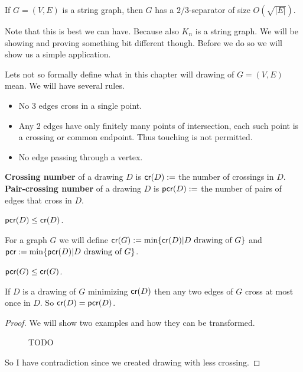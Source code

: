 \begin{thm}[Lee, 2017]
	If $G = (V,E)$ is a string graph, then $G$ has a $2/3$-separator of size $O(\sqrt{|E|})$.
	\label{lee}
\end{thm}

\noindent Note that this is best we can have. Because also $K_n$ is a string graph. We will be showing and proving something bit different though. Before we do so we will show us a simple application.

Lets not so formally define what in this chapter will drawing of $G = (V,E)$ mean. We will have several rules.

\begin{itemize}
	\item No 3 edges cross in a single point.
	\item Any 2 edges have only finitely many points of intersection, each such point is a crossing or common endpoint. Thus touching is not permitted.
	\item No edge passing through a vertex.
\end{itemize}



\begin{defn}
	\textbf{Crossing number} of a drawing $D$ is $\textsf{cr}(D) :=$ the number of crossings in $D$. \textbf{Pair-crossing number} of a drawing $D$ is $\textsf{pcr}(D) :=$ the number of pairs of edges that cross in $D$.
\end{defn}

\begin{observ}
	$\textsf{pcr}(D) \leq \textsf{cr}(D)$.
\end{observ}

For a graph $G$ we will define $\textsf{cr}(G) := \min \{\textsf{cr}(D) | D \text{ drawing of } G\}$ and $\textsf{pcr} := \min \{\textsf{pcr}(D) | D \text{ drawing of } G\}$.

\begin{observ}
	$\textsf{pcr}(G) \leq \textsf{cr}(G)$.
\end{observ}

\begin{lemma}
	If $D$ is a drawing of $G$ minimizing $\textsf{cr}(D)$ then any two edges of $G$ cross at most once in $D$. So $\textsf{cr}(D) = \textsf{pcr}(D)$.
\end{lemma}

\begin{proof}
	We will show two examples and how they can be transformed.
	
	\begin{figure}
		\caption{TODO}
	\end{figure}
	
	So I have contradiction since we created drawing with less crossing.
\end{proof}

